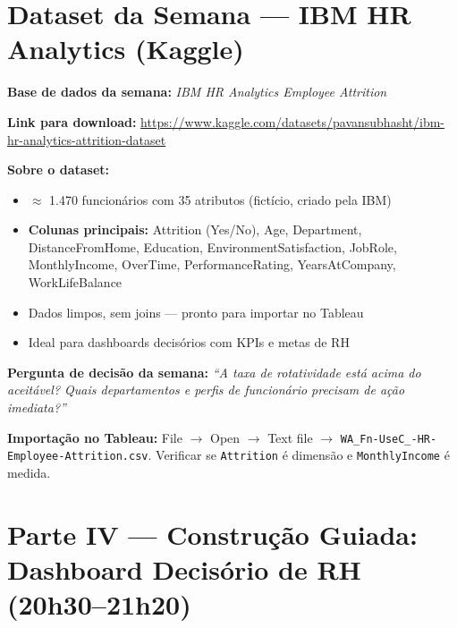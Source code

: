 \section{Dataset da Semana — IBM HR Analytics (Kaggle)}

\begin{BoardBox}
\textbf{Base de dados da semana:} \textit{IBM HR Analytics Employee Attrition}

\textbf{Link para download:}
\url{https://www.kaggle.com/datasets/pavansubhasht/ibm-hr-analytics-attrition-dataset}

\textbf{Sobre o dataset:}
\begin{itemize}
  \item $\approx$ 1.470 funcionários com 35 atributos (fictício, criado pela IBM)
  \item \textbf{Colunas principais:} Attrition (Yes/No), Age, Department,
  DistanceFromHome, Education, EnvironmentSatisfaction, JobRole,
  MonthlyIncome, OverTime, PerformanceRating, YearsAtCompany,
  WorkLifeBalance
  \item Dados limpos, sem joins — pronto para importar no Tableau
  \item Ideal para dashboards decisórios com KPIs e metas de RH
\end{itemize}

\textbf{Pergunta de decisão da semana:}
\textit{``A taxa de rotatividade está acima do aceitável? Quais
departamentos e perfis de funcionário precisam de ação imediata?''}
\end{BoardBox}

\begin{NoteBox}
\textbf{Importação no Tableau:} File $\to$ Open $\to$ Text file $\to$
\texttt{WA\_Fn-UseC\_-HR-Employee-Attrition.csv}. Verificar se
\texttt{Attrition} é dimensão e \texttt{MonthlyIncome} é medida.
\end{NoteBox}

\section{Parte IV — Construção Guiada: Dashboard Decisório de RH (20h30–21h20)}

